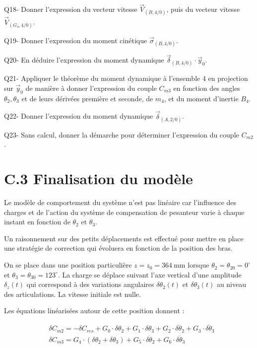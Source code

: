 \documentclass[10pt]{article}
\begin{document}
Q18- Donner l'expression du vecteur vitesse $\vec{V}_{(B, 4 / 0)}$, puis du vecteur vitesse $\vec{V}_{\left(G_{4}, 4 / 0\right)}$.

Q19- Donner l'expression du moment cinétique $\vec{\sigma}_{(B, 4 / 0)}$.

Q20- En déduire l'expression du moment dynamique $\vec{\delta}_{(B, 4 / 0)} \cdot \vec{y}_{0}$.

Q21- Appliquer le théorème du moment dynamique à l'ensemble 4 en projection sur $\vec{y}_{0}$ de manière à donner l'expression du couple $C_{m 3}$ en fonction des angles $\theta_{2}, \theta_{3}$ et de leurs dérivées première et seconde, de $m_{4}$, et du moment d'inertie $B_{4}$.

Q22- Donner l'expression du moment dynamique $\vec{\delta}_{(A, 2 / 0)}$.

Q23- Sans calcul, donner la démarche pour déterminer l'expression du couple $C_{m 2}$.

\section*{C.3 Finalisation du modèle}
Le modèle de comportement du système n'est pas linéaire car l'influence des charges et de l'action du système de compensation de pesanteur varie à chaque instant en fonction de $\theta_{2}$ et $\theta_{3}$.

Un raisonnement sur des petits déplacements est effectué pour mettre en place une stratégie de correction qui évoluera en fonction de la position des bras.

On se place dans une position particulière $z=z_{0}=364 \mathrm{~mm}$ lorsque $\theta_{2}=\theta_{20}=0^{\circ}$ et $\theta_{3}=\theta_{30}=123^{\circ}$. La charge se déplace suivant l'axe vertical d'une amplitude $\delta_{z}(t)$ qui correspond à des variations angulaires $\delta \theta_{2}(t)$ et $\delta \theta_{3}(t)$ au niveau des articulations. La vitesse initiale est nulle.

Les équations linéarisées autour de cette position donnent :

$$
\begin{aligned}
& \delta C_{m 2}=-\delta C_{r e s}+G_{0} \cdot \delta \theta_{2}+G_{1} \cdot \delta \theta_{3}+G_{2} \cdot \delta \ddot{\theta}_{2}+G_{3} \cdot \delta \ddot{\theta}_{3} \\
& \delta C_{m 3}=G_{4} \cdot\left(\delta \theta_{2}+\delta \theta_{3}\right)+G_{5} \cdot \delta \ddot{\theta}_{2}+G_{6} \cdot \delta \ddot{\theta}_{3}
\end{aligned}
$$
\end{document}
